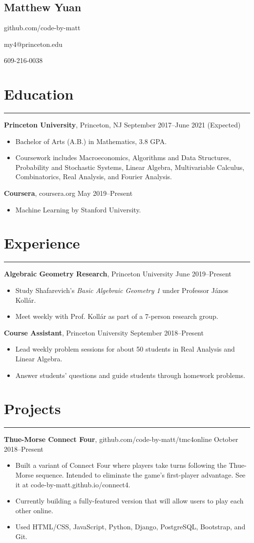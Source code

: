 \documentclass[11pt]{article}
\newcommand{\name}[1]{\begin{center}\section*{\huge #1}\end{center}}
\newcommand{\topinfo}[1]{\begin{center}\vspace{-0.2cm}#1\vspace{-0.2cm}\end{center}}
\newcommand{\resumesection}[1]{\vspace{-0.2cm}\section*{#1}\vspace{-0.2cm}\hrule\vspace{0.2cm}}
\begin{document}
\name{Matthew Yuan}
\topinfo{github.com/code-by-matt}
\topinfo{my4@princeton.edu}
\topinfo{609-216-0038}

\resumesection{Education}

\textbf{Princeton University}, Princeton, NJ \hfill September 2017--June 2021 (Expected)
\begin{itemize}
	\item Bachelor of Arts (A.B.) in Mathematics, 3.8 GPA.
	\item Coursework includes Macroeconomics, Algorithms and Data Structures, Probability and Stochastic Systems, Linear Algebra, Multivariable Calculus, Combinatorics, Real Analysis, and Fourier Analysis.
\end{itemize}

\textbf{Coursera}, coursera.org \hfill May 2019--Present
\begin{itemize}
	\item Machine Learning by Stanford University.
\end{itemize}

\resumesection{Experience}

\textbf{Algebraic Geometry Research}, Princeton University \hfill June 2019--Present
\begin{itemize}
	\item Study Shafarevich's \textit{Basic Algebraic Geometry 1} under Professor J\'{a}nos Koll\'{a}r.
	\item Meet weekly with Prof. Koll\'{a}r as part of a 7-person research group.
\end{itemize}

\textbf{Course Assistant}, Princeton University \hfill September 2018--Present
\begin{itemize}
	\item Lead weekly problem sessions for about 50 students in Real Analysis and Linear Algebra.
	\item Answer students' questions and guide students through homework problems.
\end{itemize}

\resumesection{Projects}

\textbf{Thue-Morse Connect Four}, github.com/code-by-matt/tmc4online  \hfill October 2018--Present
\begin{itemize}
	\item Built a variant of Connect Four where players take turns following the Thue-Morse sequence. Intended to eliminate the game's first-player advantage. See it at code-by-matt.github.io/connect4.
	\item Currently building a fully-featured version that will allow users to play each other online.
	\item Used HTML/CSS, JavaScript, Python, Django, PostgreSQL, Bootstrap, and Git.
\end{itemize}
\end{document}

